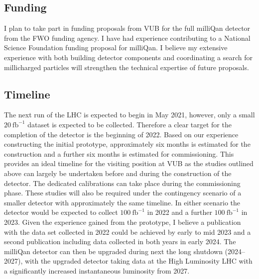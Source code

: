 \documentclass[11pt]{article}
\theoremstyle{plain} \numberwithin{equation}{section}
\theoremstyle{definition}
\begin{document}
\subsection*{Funding}

I plan to take part in funding proposals from VUB for the full milliQan detector
from the FWO funding agency. I have had experience contributing to a National Science
Foundation funding proposal for milliQan. I believe my extensive 
experience with both building detector components and coordinating 
a search for millicharged particles will strengthen the technical
expertise of future proposals.

\subsection*{Timeline}

The next run of the LHC is expected to begin in May 2021, however, only a small $20~\text{fb}^{-1}$ dataset is 
expected to be collected. Therefore a clear target for the completion of the detector
is the beginning of 2022. Based on our experience constructing the initial prototype, 
approximately six months is estimated for the construction and a further six months is
estimated for commissioning. This provides an ideal timeline for the visiting position at VUB as 
the studies outlined above can largely be undertaken before and during the construction of the detector.
The dedicated calibrations can take place during the commissioning phase. These studies will also be
required under the contingency scenario of a smaller detector with approximately the same timeline.
In either scenario the detector would be expected to collect $100~\text{fb}^{-1}$ in 2022 and a further $100~\text{fb}^{-1}$ in 2023.
Given the experience gained from the prototype, I believe a publication with the data set collected 
in 2022 could be achieved by early to mid 2023 and a second publication including data collected in both years in
early 2024. The milliQan detector can then be upgraded during next the long shutdown (2024--2027), with the upgraded
detector taking data at the High Luminosity LHC with a significantly increased instantaneous luminosity from 2027. 
\end{document}
